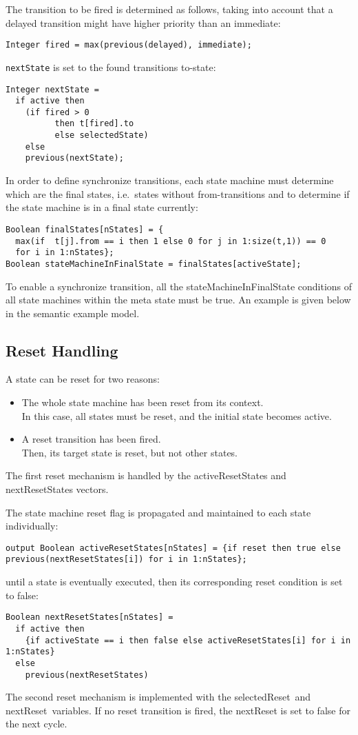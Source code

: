 The transition to be fired is determined as follows, taking into account
that a delayed transition might have higher priority than an immediate:
\begin{lstlisting}[language=modelica]
Integer fired = max(previous(delayed), immediate);
\end{lstlisting}
\lstinline!nextState! is set to the found transitions to-state:
\begin{lstlisting}[language=modelica]
Integer nextState =
  if active then
    (if fired > 0
		  then t[fired].to
		  else selectedState)
	else
    previous(nextState);
\end{lstlisting}
In order to define synchronize transitions, each state machine must
determine which are the final states, i.e.\ states without
from-transitions and to determine if the state machine is in a final
state currently:
\begin{lstlisting}[language=modelica]
Boolean finalStates[nStates] = {
  max(if  t[j].from == i then 1 else 0 for j in 1:size(t,1)) == 0
  for i in 1:nStates};
Boolean stateMachineInFinalState = finalStates[activeState];
\end{lstlisting}
To enable a synchronize transition, all the stateMachineInFinalState
conditions of all state machines within the meta state must be true. An
example is given below in the semantic example model.

\subsection{Reset Handling}\label{reset-handling}

A state can be reset for two reasons:
\begin{itemize}
\item
  The whole state machine has been reset from its context.\\
  In this case, all states must be reset, and the initial state becomes
  active.
\item
  A reset transition has been fired.\\
  Then, its target state is reset, but not other states.
\end{itemize}

The first reset mechanism is handled by the activeResetStates and
nextResetStates vectors.

The state machine reset flag is propagated and maintained to each state
individually:
\begin{lstlisting}[language=modelica]
output Boolean activeResetStates[nStates] = {if reset then true else previous(nextResetStates[i]) for i in 1:nStates};
\end{lstlisting}
until a state is eventually executed, then its corresponding reset
condition is set to false:
\begin{lstlisting}[language=modelica]
Boolean nextResetStates[nStates] =
  if active then
    {if activeState == i then false else activeResetStates[i] for i in 1:nStates}
  else
    previous(nextResetStates)
\end{lstlisting}
The second reset mechanism is implemented with the selectedReset~and
nextReset~variables. If no reset transition is fired, the nextReset is
set to false for the next cycle.


